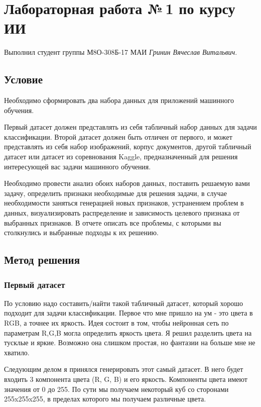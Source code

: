 \documentclass[12pt]{article}
\begin{document}
	\section*{Лабораторная работа №\,1 по курсу ИИ}
	Выполнил студент группы М8О-308Б-17 МАИ \textit{Гринин Вячеслав Витальвич}.
	
	\subsection*{Условие}
	
	Необходимо сформировать два набора данных для приложений машинного обучения. 
    
    Первый датасет должен представлять из себя табличный набор данных для задачи классификации. Второй датасет должен быть отличен от первого, и может представлять из себя набор изображений, корпус документов, другой табличный датасет или датасет из соревнования Kaggle, предназначенный для решения интересующей вас задачи машинного обучения. 
    
    Необходимо провести анализ обоих наборов данных, поставить решаемую вами задачу, определить признаки необходимые для решения задачи, в случае необходимости заняться генерацией новых признаков, устранением проблем в данных, визуализировать распределение и зависимость целевого признака от выбранных признаков. В отчете описать все проблемы, с которыми вы столкнулись и выбранные подходы к их решению.
	
	\subsection*{Метод решения}
	
	\subsubsection*{Первый датасет}
	По условию надо составить/найти такой табличный датасет, который хорошо подходит для задачи классификации. Первое что мне пришло на ум - это цвета в RGB, а точнее их яркость. Идея состоит в том, чтобы нейронная сеть по параметрам R,G,B могла определить яркость цвета. Я решил разделить цвета на тусклые и яркие. Возможно она слишком простая, но фантазии на больше мне не хватило. 
	
	Следующим делом я принялся генерировать этот самый датасет. В него будет входить 3 компонента цвета (R, G, B) и его яркость. Компоненты цвета имеют значения от 0 до 255. По сути мы получаем некоторый куб со сторонами 255x255x255, в пределах которого мы получаем различные цвета.
	
\end{document}
